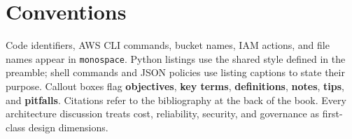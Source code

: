 \section*{Conventions}
Code identifiers, AWS CLI commands, bucket names, IAM actions, and file names appear in \texttt{monospace}. Python listings use the shared style defined in the preamble; shell commands and JSON policies use listing captions to state their purpose. Callout boxes flag \textbf{objectives}, \textbf{key terms}, \textbf{definitions}, \textbf{notes}, \textbf{tips}, and \textbf{pitfalls}. Citations refer to the bibliography at the back of the book. Every architecture discussion treats cost, reliability, security, and governance as first-class design dimensions.
